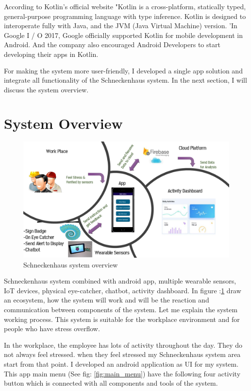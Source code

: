 According to Kotlin's official website "Kotlin is a cross-platform, statically typed, general-purpose programming language with type inference. Kotlin is designed to interoperate fully with Java, and the JVM (Java Virtual  Machine) version. 'In Google I / O 2017, Google officially supported Kotlin for mobile development in Android. And the company also encouraged Android Developers to start developing their apps in Kotlin. 

For making the system more user-friendly, I developed a single app solution and integrate all functionality of the Schneckenhaus system. In the next section, I will discuss the system overview.

\section{System Overview}

\begin{figure}[hbt!] 
  \centering
  \includegraphics[width=1.0\linewidth]{chap4/image4/Overview.pdf}
  \caption[Schneckenhaus system overview ]{Schneckenhaus system overview}
  \label{fig:overview_Stress}
\end{figure}
Schneckenhaus system combined with android app, multiple wearable sensors, IoT devices, physical eye-catcher, chatbot, activity dashboard. In figure :\ref{fig:overview_Stress} draw an ecosystem, how the system will work and will be the reaction and communication between components of the system. Let me explain the system working process. This system is suitable for the workplace environment and for people who have stress overflow.

In the workplace, the employee has lots of activity throughout the day. They do not always feel stressed. when they feel stressed my Schneckenhaus system area start from that point. I developed an android application as \acf{UI} for my system. This app main menu (See fig: \ref{fig:main_menu}) have the following four activity button which is connected with all components and tools of the system. 

